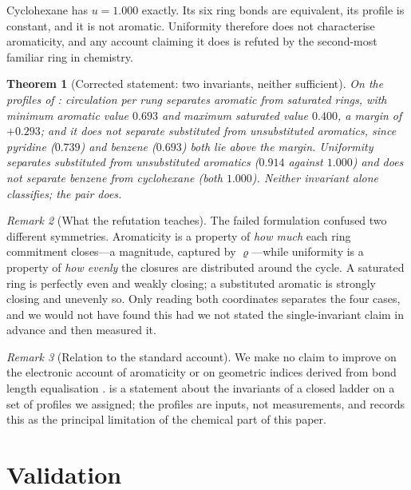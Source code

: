 \documentclass[11pt,a4paper]{article}
\theoremstyle{clthm}
\newtheorem{theorem}{Theorem}[section]
\theoremstyle{definition}
\theoremstyle{remark}
\newtheorem{remark}[theorem]{Remark}
\newcommand{\circu}{\varrho}
\newcommand{\unif}{u}
\begin{document}
Cyclohexane has $\unif=1.000$ exactly. Its six ring bonds are equivalent,
its profile is constant, and it is not aromatic. Uniformity therefore does
not characterise aromaticity, and any account claiming it does is refuted
by the second-most familiar ring in chemistry.

\begin{theorem}[Corrected statement: two invariants, neither sufficient]
\label{thm:arom}
On the profiles of : circulation per rung separates
aromatic from saturated rings, with minimum aromatic value $0.693$ and
maximum saturated value $0.400$, a margin of $+0.293$; and it does not
separate substituted from unsubstituted aromatics, since pyridine
($0.739$) and benzene ($0.693$) both lie above the margin. Uniformity
separates substituted from unsubstituted aromatics ($0.914$ against
$1.000$) and does not separate benzene from cyclohexane (both $1.000$).
Neither invariant alone classifies; the pair does.
\end{theorem}

\begin{remark}[What the refutation teaches]
\label{rem:arom-lesson}
The failed formulation confused two different symmetries. Aromaticity is a
property of \emph{how much} each ring commitment closes---a magnitude,
captured by $\circu$---while uniformity is a property of \emph{how evenly}
the closures are distributed around the cycle. A saturated ring is perfectly
even and weakly closing; a substituted aromatic is strongly closing and
unevenly so. Only reading both coordinates separates the four cases, and
we would not have found this had we not stated the single-invariant claim
in advance and then measured it.
\end{remark}

\begin{remark}[Relation to the standard account]
\label{rem:huckel}
We make no claim to improve on the electronic account of aromaticity
\citep{huckel1931,schleyer2001} or on geometric indices derived from bond
length equalisation \citep{krygowski2014}.  is a statement
about the invariants of a closed ladder on a set of profiles we assigned;
the profiles are inputs, not measurements, and  records
this as the principal limitation of the chemical part of this paper.
\end{remark}

\section{Validation}
\label{sec:validation}
\end{document}
